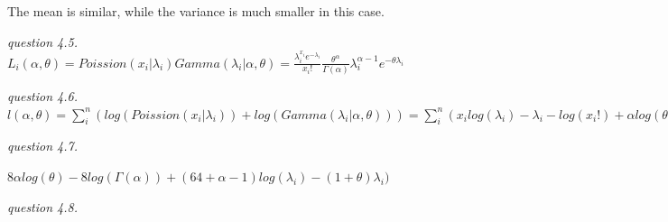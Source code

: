 \documentclass{article}
\begin{document}
The mean is similar, while the variance is much smaller in this case.

\vspace{\baselineskip}
\textit{question 4.5.}
$L_i(\alpha, \theta)=Poission(x_i|\lambda_i)Gamma(\lambda_i|\alpha, \theta)=\frac{\lambda_i^{x_i}e^{-\lambda_i}}{x_i!}\frac{\theta^\alpha}{\Gamma(\alpha)}\lambda_i^{\alpha-1}e^{-\theta\lambda_i}$

\vspace{\baselineskip}
\textit{question 4.6.}
$l(\alpha, \theta)=\sum_i^n\left(log\left(Poission(x_i|\lambda_i)\right)+log\left(Gamma(\lambda_i|\alpha, \theta)\right)\right)=\sum_i^n\left(x_ilog(\lambda_i)-\lambda_i-log(x_i!)+\alpha log(\theta)-log\left(\Gamma(\alpha)\right)+(\alpha-1)log(\lambda_i)-\theta\lambda_i\right)=n\alpha log(\theta)-nlog(\Gamma(\alpha))\sum_i^n\left(x_i+\alpha-1)log(\lambda_i)-(1+\theta)\lambda_i\right)$

\vspace{\baselineskip}
\textit{question 4.7.}

$8\alpha log(\theta)-8log(\Gamma(\alpha))+(64+\alpha-1)log(\lambda_i)-(1+\theta)\lambda_i)$

\vspace{\baselineskip}
\textit{question 4.8.}
\end{document}
